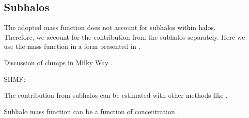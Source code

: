 \subsection{Subhalos}

The adopted mass function does not account for subhalos within halos. Therefore, we account for the contribution from the subhalos separately. Here we use the mass function in a form presented in \cite{Sanchez_Conde_2014}.

Discussion of clumps in Milky Way \cite{Belotsky_2014}.

SHMF:
\cite{Bosch_2014}
\cite{Cautun_2014}

The contribution from subhalos can be estimated with other methods like \cite{2015arXiv150802713Z}.

Subhalo mass function can be a function of concentration \cite{Mao_2015, Emberson_2015}.
